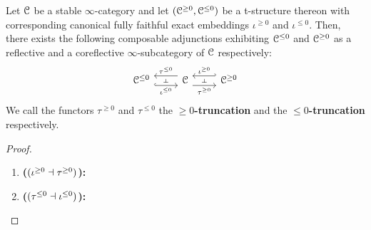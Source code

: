                 \begin{proposition} \label{prop: t_structures_and_localisations}
                    Let $\mathcal{C}$ be a stable $\infty$-category and let $(\mathcal{C}^{\geq 0}, \mathcal{C}^{\leq 0})$ be a t-structure thereon with corresponding canonical fully faithful exact embeddings $\iota^{\geq 0}$ and $\iota^{\leq 0}$. Then, there exists the following composable adjunctions exhibiting $\mathcal{C}^{\leq 0}$ and $\mathcal{C}^{\geq 0}$ as a reflective and a coreflective $\infty$-subcategory of $\mathcal{C}$ respectively:
                        $$
                            \begin{tikzcd}
                            	{\C^{\leq 0}} & \C & {\C^{\geq 0}}
                            	\arrow[""{name=0, anchor=center, inner sep=0}, "{\iota^{\leq 0}}"', shift right=2, hook, from=1-1, to=1-2]
                            	\arrow[""{name=1, anchor=center, inner sep=0}, "{\tau^{\leq 0}}"', shift right=2, from=1-2, to=1-1]
                            	\arrow[""{name=2, anchor=center, inner sep=0}, "{\tau^{\geq 0}}"', shift right=2, from=1-2, to=1-3]
                            	\arrow[""{name=3, anchor=center, inner sep=0}, "{\iota^{\geq 0}}"', shift right=2, hook', from=1-3, to=1-2]
                            	\arrow["\dashv"{anchor=center, rotate=-90}, draw=none, from=1, to=0]
                            	\arrow["\dashv"{anchor=center, rotate=-90}, draw=none, from=3, to=2]
                            \end{tikzcd}
                        $$
                    We call the functors $\tau^{\geq 0}$ and $\tau^{\leq 0}$ the \textbf{$\geq 0$-truncation} and the \textbf{$\leq 0$-truncation} respectively.
                \end{proposition}
                    \begin{proof}
                        \noindent
                        \begin{enumerate}
                            \item \textbf{($(\iota^{\geq 0} \dashv \tau^{\geq 0})$):}    
                            \item \textbf{($(\tau^{\leq 0} \dashv \iota^{\leq 0})$):} 
                        \end{enumerate}
                    \end{proof}
